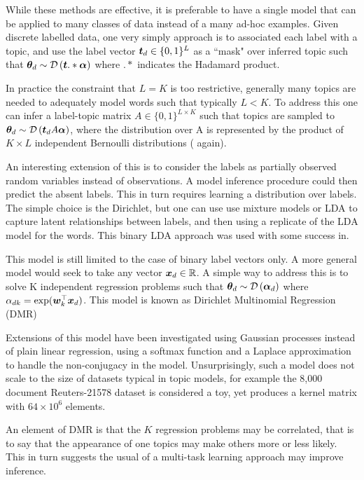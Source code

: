 While these methods are effective, it is preferable to have a single model that can be applied to many classes of data instead of a many ad-hoc examples. Given discrete labelled data, one very simply approach is to associated each label with a topic, and use the label vector $\bm t_d \in \{0,1\}^L$ as a ``mask" over inferred topic such that ${ \bm \theta_d } \sim \mathcal{D} \left( {\bm t .* \bm \alpha} \right)$\cite{Ramage2009} where $.*$ indicates the Hadamard product.

In practice the constraint that $L = K$ is too restrictive, generally many topics are needed to adequately model words such that typically $L < K$. To address this one can infer a label-topic matrix $A \in \{0,1\}^{L \times K}$ such that topics are sampled to ${ \bm \theta_d } \sim \mathcal{D} \left( {\bm t_d A \bm \alpha} \right)$, where the distribution over A is represented by the product of $K \times L$ independent Bernoulli distributions (\cite{Ramage2009} again).

An interesting extension of this is to consider the labels as partially observed random variables instead of observations. A model inference procedure could then predict the absent labels. This in turn requires learning a distribution over labels. The simple choice is the Dirichlet, but one can use use mixture models or LDA to capture latent relationships between labels, and then using a replicate of the LDA model for the words. This binary LDA approach was used with some success in\cite{Rubin2011}. 

This model is still limited to the case of binary label vectors only. A more general model would seek to take any vector ${ \bm x_d } \in \mathbb{R}$. A simple way to address this is to solve K independent regression problems such that ${ \bm \theta_d } \sim \mathcal{D} \left( {\bm \alpha_{d}} \right)$ where $\alpha_{dk} = \exp(\bm w_k^\top\bm x_d)$\cite{Mimno2008}. This model is known as Dirichlet Multinomial Regression (DMR)

Extensions of this model have been investigated using Gaussian processes instead of plain linear regression, using a softmax function\cite{Hennig2012} and a Laplace approximation\cite{WilliamsBarber1998} to handle the non-conjugacy in the model. Unsurprisingly, such a model does not scale to the size of datasets typical in topic models, for example the 8,000 document Reuters-21578 dataset is considered a toy, yet produces a kernel matrix with $64 \times 10^6$ elements.

An element of DMR is that the $K$ regression problems may be correlated, that is to say that the appearance of one topics may make others more or less likely. This in turn suggests the usual of a multi-task learning approach may improve inference.


